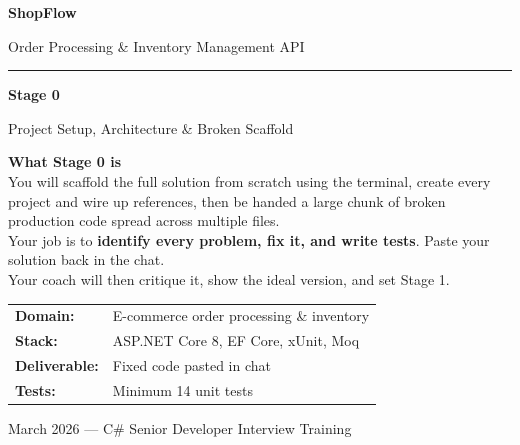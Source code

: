\documentclass[11pt,a4paper]{article}
\begin{document}
\begin{titlepage}
\centering
\vspace*{2.5cm}
{\Huge\bfseries\color{primary}ShopFlow\par}
\vspace{0.25cm}
{\large\color{gray}Order Processing \& Inventory Management API\par}
\vspace{0.9cm}
\rule{0.6\textwidth}{1.5pt}
\vspace{0.9cm}
{\LARGE\bfseries\color{warn}Stage 0\par}
\vspace{0.2cm}
{\large Project Setup, Architecture \& Broken Scaffold\par}
\vspace{1.8cm}

\begin{infobox}
\textbf{What Stage 0 is}\\[6pt]
You will scaffold the full solution from scratch using the terminal,
create every project and wire up references, then be handed a large chunk
of broken production code spread across multiple files.\\[6pt]
Your job is to \textbf{identify every problem, fix it, and write tests}.
Paste your solution back in the chat.\\[6pt]
Your coach will then critique it, show the ideal version, and set Stage 1.
\end{infobox}

\vspace{1.2cm}
\begin{center}
\begin{tabular}{ll}
\textbf{Domain:}      & E-commerce order processing \& inventory \\
\textbf{Stack:}       & ASP.NET Core 8, EF Core, xUnit, Moq \\
\textbf{Deliverable:} & Fixed code pasted in chat \\
\textbf{Tests:}       & Minimum 14 unit tests \\
\end{tabular}
\end{center}

\vfill
{\small\color{gray}March 2026 --- C\# Senior Developer Interview Training}
\end{titlepage}

\tableofcontents
\newpage

\end{document}
